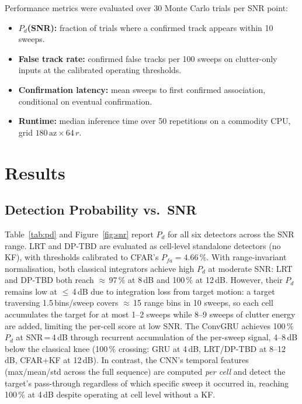\documentclass[conference]{IEEEtran}
\begin{document}
Performance metrics were evaluated over 30 Monte Carlo trials per SNR point:
\begin{itemize}
  \item \textbf{$P_d$(SNR):} fraction of trials where a confirmed track
        appears within 10 sweeps.
  \item \textbf{False track rate:} confirmed false tracks per 100 sweeps on
        clutter-only inputs at the calibrated operating thresholds.
  \item \textbf{Confirmation latency:} mean sweeps to first confirmed
        association, conditional on eventual confirmation.
  \item \textbf{Runtime:} median inference time over 50 repetitions on a
        commodity CPU, grid $180\,\mathrm{az} \times 64\,r$.
\end{itemize}

\section{Results}

\subsection{Detection Probability vs.\ SNR}

Table~\ref{tab:pd} and Figure~\ref{fig:snr} report $P_d$ for all six
detectors across the SNR range.
LRT and DP-TBD are evaluated as cell-level standalone detectors (no KF),
with thresholds calibrated to CFAR's $P_{fa} = 4.66\,\%$.
With range-invariant normalisation, both classical integrators achieve
high $P_d$ at moderate SNR: LRT and DP-TBD both reach $\approx$\,97\,\%
at 8\,dB and 100\,\% at 12\,dB.
However, their $P_d$ remains low at $\leq$\,4\,dB due to integration loss
from target motion: a target traversing 1.5\,bins/sweep covers
$\approx$\,15 range bins in 10 sweeps, so each cell accumulates the
target for at most 1--2 sweeps while 8--9 sweeps of clutter energy are
added, limiting the per-cell score at low SNR.
The ConvGRU achieves 100\,\% $P_d$ at SNR\,=\,4\,dB through recurrent
accumulation of the per-sweep signal, 4--8\,dB below the classical knee
(100\,\% crossing: GRU at 4\,dB, LRT/DP-TBD at 8--12\,dB, CFAR+KF at 12\,dB).
In contrast, the CNN's temporal features (max/mean/std across the full
sequence) are computed \emph{per cell} and detect the target's
pass-through regardless of which specific sweep it occurred in, reaching
100\,\% at 4\,dB despite operating at cell level without a KF.
\end{document}
